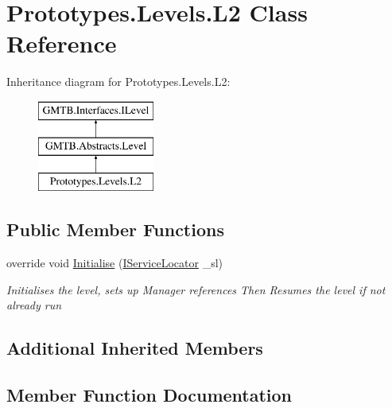 \hypertarget{class_prototypes_1_1_levels_1_1_l2}{}\section{Prototypes.\+Levels.\+L2 Class Reference}
\label{class_prototypes_1_1_levels_1_1_l2}
Inheritance diagram for Prototypes.\+Levels.\+L2\+:\begin{figure}[H]
\begin{center}
\leavevmode
\includegraphics[height=3.000000cm]{class_prototypes_1_1_levels_1_1_l2}
\end{center}
\end{figure}
\subsection*{Public Member Functions}
\begin{DoxyCompactItemize}
\item 
override void \mbox{\hyperlink{class_prototypes_1_1_levels_1_1_l2_a44a8b18b374ec89d0970e13b5da57806}{Initialise}} (\mbox{\hyperlink{interface_g_m_t_b_1_1_interfaces_1_1_i_service_locator}{I\+Service\+Locator}} \+\_\+sl)
\begin{DoxyCompactList}\small\item\em Initialises the level, sets up Manager references Then Resumes the level if not already run \end{DoxyCompactList}\end{DoxyCompactItemize}
\subsection*{Additional Inherited Members}


\subsection{Member Function Documentation}
\mbox{\label{class_prototypes_1_1_levels_1_1_l2_a44a8b18b374ec89d0970e13b5da57806}} 
